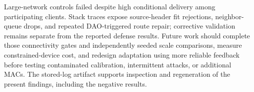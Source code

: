 Large-network controls failed despite high conditional delivery among participating clients. Stack traces expose source-header fit rejections, neighbor-queue drops, and repeated DAO-triggered route repair; corrective validation remains separate from the reported defense results. Future work should complete those connectivity gates and independently seeded scale comparisons, measure constrained-device cost, and redesign adaptation using more reliable feedback before testing contaminated calibration, intermittent attacks, or additional MACs. The stored-log artifact supports inspection and regeneration of the present findings, including the negative results.
